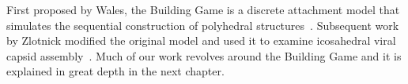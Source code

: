 First proposed by Wales, the Building Game is a discrete attachment model that simulates the sequential construction of polyhedral structures~\cite{Wales1987}. Subsequent work by Zlotnick modified the original model and used it to examine icosahedral viral capsid assembly~\cite{Zlotnick1994, Endres2005}. Much of our work revolves around the Building Game and it is explained in great depth in the next chapter.



%
%
%

